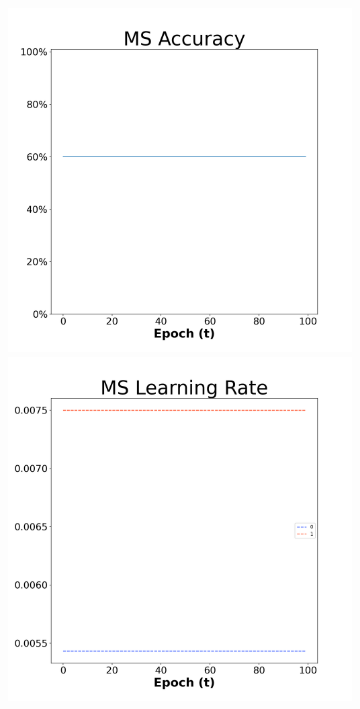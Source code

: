 \begin{figure}[H]
    \centering %
\begin{subfigure}{0.3\textwidth}
  \includegraphics[width=\linewidth]{images/exper1/NSP/MS_0.01_acc.png}
    \includegraphics[width=\linewidth]{images/exper1/NSP/MS_0.01_lr.png}

\end{subfigure}
\end{figure}
